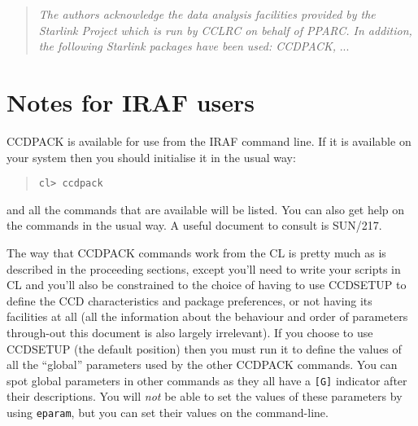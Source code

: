 \documentclass[twoside,11pt]{article}
\newcommand{\xref}[3]{#1}
\newcommand{\xlabel}[1]{}
\renewcommand{\_}{\texttt{\symbol{95}}}
\newcommand{\routine}[1]{{\sc #1}}
\begin{document}
\begin{center}
\begin{quote}
\emph{The authors acknowledge the data analysis facilities provided by
the Starlink Project which is run by CCLRC on behalf of PPARC. In
addition, the following Starlink packages have been used: CCDPACK,} ...
\end{quote}
\end{center}

\newpage
\appendix
\section{Notes for IRAF users \xlabel{IRAFNOTES} \label{IRAFNOTES} }

CCDPACK is available for use from the IRAF command line. If it is
available on your system then you should initialise it in the usual
way:
\begin{quote}
\begin{verbatim}
cl> ccdpack
\end{verbatim}
\end{quote}
and all the commands that are available will be listed. You can also
get help on the commands in the usual way. A useful document to
consult is \xref{SUN/217}{sun217}{}.

The way that CCDPACK commands work from the CL is pretty much as is
described in the proceeding sections, except you'll need to write your
scripts in CL and you'll also be constrained to the choice of having
to use \routine{CCDSETUP} to define the CCD characteristics and
package preferences, or not having its facilities at all (all the
information about the behaviour and order of parameters through-out
this document is also largely irrelevant). If you choose to use
\routine{CCDSETUP} (the default position) then you must run it to
define the values of all the ``global'' parameters used by the other
CCDPACK commands. You can spot global parameters in other commands as
they all have a \verb+[G]+ indicator after their descriptions. You
will {\em{not}} be able to set the values of these parameters by using
\verb+eparam+, but you can set their values on the command-line.
\end{document}
